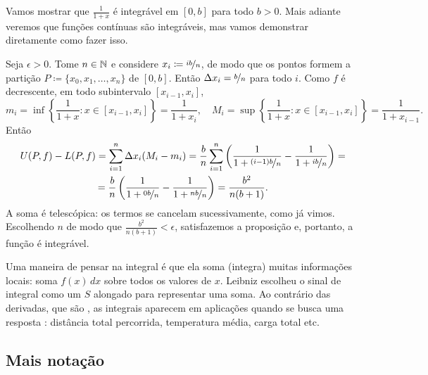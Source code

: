 \begin{example}
Vamos mostrar que $\frac{1}{1+x}$ é integrável em $[0,b]$ para todo $b > 0$.
Mais adiante veremos que funções contínuas são integráveis, mas vamos
demonstrar diretamente como fazer isso.

Seja $\epsilon > 0$. Tome $n \in {\mathbb{N}}$ e
considere $x_i \coloneqq \nicefrac{ib}{n}$, de modo que os pontos formem a
partição $P \coloneqq \{ x_0,x_1,\ldots,x_n \}$ de $[0,b]$.
Então $\Delta x_i = \nicefrac{b}{n}$ para todo $i$.
Como $f$ é decrescente, em todo subintervalo $[x_{i-1},x_i]$,
\begin{equation*}
m_i
=
\inf \left\{ \frac{1}{1+x} : x \in [x_{i-1},x_i] \right\} = \frac{1}{1+x_i} ,
\quad
M_i
=
\sup \left\{ \frac{1}{1+x} : x \in [x_{i-1},x_i] \right\} =
\frac{1}{1+x_{i-1}} .
\end{equation*}
Então
\begin{multline*}
U(P,f)-L(P,f)
=
\sum_{i=1}^n
\Delta x_i
(M_i-m_i)
=
\frac{b}{n}
\sum_{i=1}^n 
\left( \frac{1}{1+\nicefrac{(i-1)b}{n}} - \frac{1}{1+\nicefrac{ib}{n}} \right) 
=
\\
=
\frac{b}{n}
\left( \frac{1}{1+\nicefrac{0b}{n}} - \frac{1}{1+\nicefrac{nb}{n}} \right) 
=
\frac{b^2}{n(b+1)} .
\end{multline*}
A soma é telescópica: os termos se cancelam sucessivamente, como já vimos.
Escolhendo $n$ de modo que
$\frac{b^2}{n(b+1)} < \epsilon$, satisfazemos a proposição e, portanto, a
função é integrável.
\end{example}

\begin{remark}
Uma maneira de pensar na integral é que ela soma (integra) muitas informações
locais: soma $f(x)\,dx$ sobre todos os valores de $x$.
Leibniz escolheu o sinal de integral como um $S$ alongado para representar
uma soma.
Ao contrário das derivadas, que são ,
as integrais aparecem em aplicações quando se busca uma resposta
: distância total percorrida, temperatura média, carga total
etc.
\end{remark}

\subsection{Mais notação}

